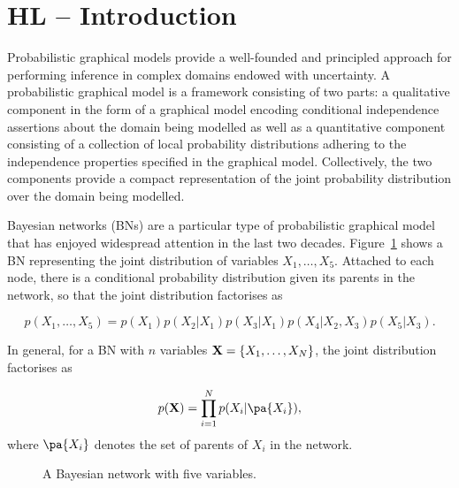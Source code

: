 \section{HL -- Introduction}



Probabilistic graphical models provide a well-founded and principled approach for performing inference 
in complex domains endowed with uncertainty. A probabilistic graphical model is a framework consisting 
of two parts: a qualitative component in the form of a graphical model encoding conditional independence 
assertions about the domain being modelled as well as a quantitative component consisting of a collection of local 
probability distributions adhering to the independence properties specified in the graphical model. Collectively, the 
two components provide a compact representation of the joint probability distribution over the domain being modelled. 

Bayesian networks (BNs) \cite{Pearl88} are a particular type of
probabilistic graphical model that has enjoyed widespread attention in
the last two decades. Figure~\ref{fig:sampleBN} shows a BN representing
the joint distribution of variables $X_1,\ldots,X_5$. Attached to each node, there is a conditional probability
distribution given its parents in the network, so that the joint distribution factorises as

\[
p(X_1,\ldots,X_5) = p(X_1) p(X_2|X_1) p(X_3|X_1) p(X_4|X_2,X_3) p(X_5|X_3).
\]

In general, for a BN with $n$ variables $\bX=\{X_1,\ldots,X_N\}$, the joint distribution factorises as

\begin{equation}
\label{eq:factorisation}
p(\bX) = \prod_{i=1}^N p(X_i|\pa{X_i}) ,
\end{equation}
where $\pa{X_i}$ denotes the set of parents of $X_i$ in the network. 

\begin{figure}[htb]
  \begin{center}
  \end{center}
  \caption{A Bayesian network with five variables.}
  \label{fig:sampleBN}
\end{figure}


